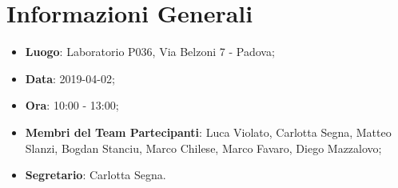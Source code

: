 \section{Informazioni Generali}
\begin{itemize}
	\item \textbf{Luogo}: Laboratorio P036, Via Belzoni 7 - Padova; 
	\item \textbf{Data}: 2019-04-02;
	\item \textbf{Ora}: 10:00 - 13:00;
	\item \textbf{Membri del Team Partecipanti}: Luca Violato, Carlotta Segna, Matteo Slanzi, Bogdan Stanciu, Marco Chilese, Marco Favaro, Diego Mazzalovo; 
	\item \textbf{Segretario}: Carlotta Segna. 
\end{itemize}


